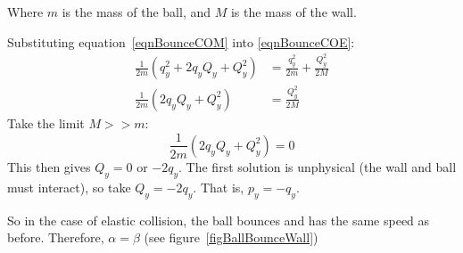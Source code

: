 \documentclass[../Main.tex]{subfiles}
\begin{document}
Where $m$ is the mass of the ball, and $M$ is the mass of the wall.\par
Substituting equation~\ref{eqnBounceCOM} into \ref{eqnBounceCOE}:
\begin{align*}
    \frac{1}{2m}\left(q_y^2 + 2q_y Q_y + Q_y^2\right) &= \frac{q_y^2}{2m} + \frac{Q_y^2}{2M} \\
    \frac{1}{2m}\left(2q_yQ_y + Q_y^2\right) &= \frac{Q_y^2}{2M}
\end{align*}
Take the limit $M >> m$:
\begin{equation*}
    \frac{1}{2m} \left(2q_yQ_y + Q_y^2\right) = 0
\end{equation*}
This then gives $Q_y = 0$ or $-2q_y$. The first solution is unphysical (the wall and ball must interact), so take $Q_y = -2q_y$. That is, $p_y = -q_y$.\par
So in the case of elastic collision, the ball bounces and has the same speed as before. Therefore, $\alpha = \beta$ (see figure~\ref{figBallBounceWall})
\end{document}
